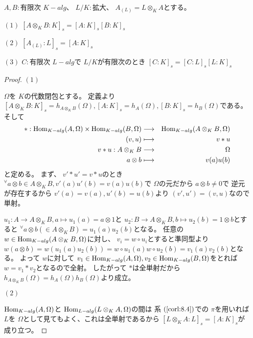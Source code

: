 \documentclass[../master_galois_theory]{subfiles}
\begin{document}
\begin{prop} \label{prop:8.9}
  $A,B :$有限次 $K-alg$、 $L/K:$拡大、 $A_{(L)} = L \otimes_K A$とする。

  $(1)$
  $[A \otimes_K B:K]_s = [A:K]_s [B:K]_s$

  $(2)$
  $[A_{(L)}:L]_s = [A:K]_s$

  $(3)$
  $C:$有限次 $L-alg$で $L/K$が有限次のとき
  $[C:K]_s = [C:L]_s [L:K]_s$
\end{prop}

\begin{proof}
  $(1)$

  $\Omega$を $K$の代数閉包とする。
  定義より $[A \otimes_K B:K]_s = h_{A \otimes_K B}(\Omega) ,
  [A:K]_s = h_A(\Omega) , [B:K]_s = h_B(\Omega)$である。
  そして
  \begin{eqnarray*}
    * :  \mathrm{Hom}_{K-alg}(A , \Omega) \times \mathrm{Hom}_{K-alg}(B , \Omega)
     & \longrightarrow &  \mathrm{Hom}_{K-alg}(A \otimes_K B , \Omega) \\
     (v , u) & \longmapsto & v * u \\
     v * u : A \otimes_K B & \longrightarrow & \Omega \\
     a \otimes b & \longmapsto & v(a) u(b)
  \end{eqnarray*}
  と定める。
  まず、 $v' * u' = v * u$のとき ${}^\forall a \otimes b \in A \otimes_K B , v'(a) u'(b) = v(a) u(b)$で $\Omega$の元だから $a \otimes b \neq 0$で
  逆元が存在するから $v'(a) = v(a) , u'(b) = u(b)$より $(v',u') = (v,u)$なので単射。

  $u_1 : A \longrightarrow A \otimes_K B , a \longmapsto u_1(a) = a \otimes 1$と
  $u_2 : B \longrightarrow A \otimes_K B , b \longmapsto u_2(b) = 1 \otimes b$とすると
  ${}^\forall a \otimes b (\in A \otimes_K B) = u_1(a) u_2(b)$となる。
  任意の $w \in \mathrm{Hom}_{K-alg}(A \otimes_K B , \Omega)$に対し、
  $v_i = w \circ u_i$とすると準同型より
  $w(a \otimes b) = w(u_1(a) u_2(b)) = w \circ u_1(a) w \circ u_2(b) = v_1(a) v_2(b)$となる。
  よって $w$に対して $v_1 \in \mathrm{Hom}_{K-alg}(A,\Omega) , v_2 \in \mathrm{Hom}_{K-alg}(B,\Omega)$をとれば $w = v_1 * v_2$となるので全射。
  したがって $*$は全単射だから $h_{A \otimes_K B}(\Omega) = h_A(\Omega) h_B(\Omega)$より成立。

  $(2)$

  $\mathrm{Hom}_{K-alg}(A,\Omega)$と $\mathrm{Hom}_{L-alg}(L \otimes_K A , \Omega)$の間は
  系 $(\mathrm{\ref{corl:8.4}})$での $\pi$を用いれば
  $L$を $\Omega$として見てもよく、これは全単射であるから
  $[L \otimes_K A : L]_s = [A:K]_s$が成り立つ。


\end{proof}
\end{document}
